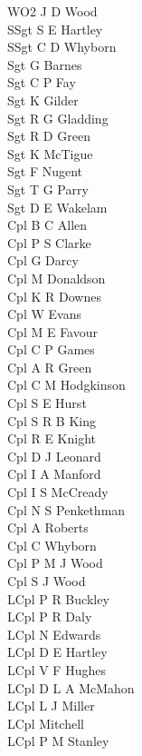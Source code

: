 \begin{multicols}{3}
  \small
  \noindent
  WO2 J D Wood \\
  SSgt S E Hartley \\
  SSgt C D Whyborn \\
  Sgt G Barnes \\
  Sgt C P Fay \\
  Sgt K Gilder \\
  Sgt R G Gladding \\
  Sgt R D Green \\
  Sgt K McTigue \\
  Sgt F Nugent \\
  Sgt T G Parry \\
  Sgt D E Wakelam \\
  Cpl B C Allen \\
  Cpl P S Clarke \\
  Cpl G Darcy \\
  Cpl M Donaldson \\
  Cpl K R Downes \\
  Cpl W Evans \\
  Cpl M E Favour \\
  Cpl C P Games \\
  Cpl A R Green \\
  Cpl C M Hodgkinson \\
  Cpl S E Hurst \\
  Cpl S R B King \\
  Cpl R E Knight \\
  Cpl D J Leonard \\
  Cpl I A Manford \\
  Cpl I S McCready \\
  Cpl N S Penkethman \\
  Cpl A Roberts \\
  Cpl C Whyborn \\
  Cpl P M J Wood \\
  Cpl S J Wood \\
  LCpl P R Buckley \\
  LCpl P R Daly \\
  LCpl N Edwards \\
  LCpl D E Hartley \\
  LCpl V F Hughes \\
  LCpl D L A McMahon \\
  LCpl L J Miller \\
  LCpl Mitchell \\
  LCpl P M Stanley \\

\end{multicols}
